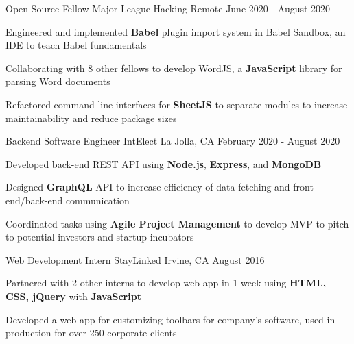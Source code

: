 \documentclass[]{awesome-cv}
\begin{document}
\vspace{-3mm}
\begin{cventries}
  \vspace{-1mm}
	\cventry
  {Open Source Fellow}
	{Major League Hacking}
  {Remote}
	{June 2020 - August 2020}
	{\begin{cvitems}
    \item {Engineered and implemented \textbf{Babel} plugin import system in Babel Sandbox, an
      IDE to teach Babel fundamentals}
    \item {Collaborating with 8 other fellows to develop WordJS, a \textbf{JavaScript} library
    for parsing Word documents}
    \item {Refactored command-line interfaces for \textbf{SheetJS}
      to separate modules to increase
      maintainability and reduce package sizes}
		\end{cvitems}}

	\vspace{-3mm}
	\cventry
  {Backend Software Engineer}
	{IntElect}
	{La Jolla, CA}
	{February 2020 - August 2020}
	{\begin{cvitems}
    \item {Developed back-end REST API
      using \textbf{Node.js}, \textbf{Express}, and \textbf{MongoDB}}
    \item {Designed \textbf{GraphQL} API to increase efficiency of data fetching
      and front-end/back-end communication}
    \item {Coordinated tasks using \textbf{Agile
      Project Management} to develop MVP to pitch to potential investors and
      startup incubators}
		\end{cvitems}}

	\vspace{-3mm}
	\cventry
	{Web Development Intern}
	{StayLinked}
	{Irvine, CA}
	{August 2016}
	{\begin{cvitems}
    \item {Partnered with 2 other interns to develop web app in 1 week using
      \textbf{HTML, CSS, jQuery} with \textbf{JavaScript}}
		\item {Developed a web app for customizing toolbars for company’s software,
      used in production for over 250 corporate clients}
		\end{cvitems}}
\end{cventries}
\end{document}
